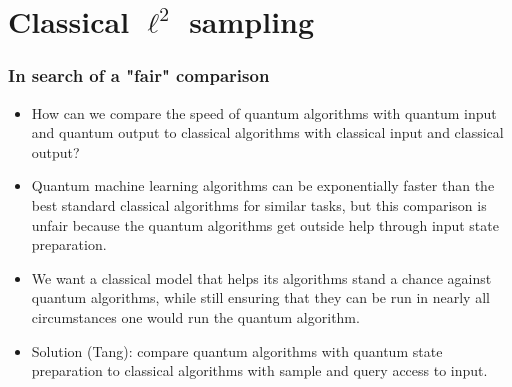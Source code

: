 \documentclass{beamer}
\newcommand\0{\mathbf{0}}
\newcommand\<{\langle}
\renewcommand\>{\rangle}
\begin{document}
\section{Classical $\ell^2$ sampling}

\begin{frame}
\frametitle{In search of a "fair" comparison}	

\begin{itemize}
\item How can we compare the speed of quantum algorithms with quantum input and quantum output to classical algorithms with classical input and classical output? 
\item Quantum machine learning algorithms can be exponentially faster than the best standard classical algorithms for similar tasks, but this comparison is unfair because the quantum algorithms get outside help through input state preparation. 
\item We want a classical model that helps its algorithms stand a chance against quantum algorithms, while still ensuring that they can be run in nearly all circumstances one would run the quantum algorithm. 
\pause
\item Solution (Tang): compare quantum algorithms with quantum state preparation to classical algorithms with sample and query access to input.	
\end{itemize}
\end{frame}

\end{document}
